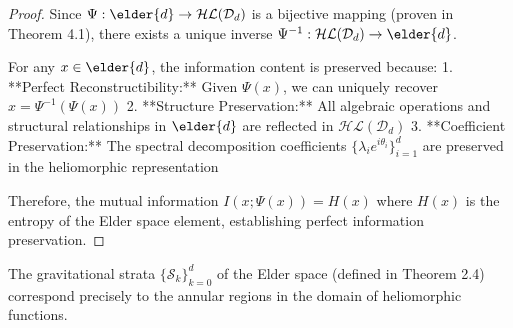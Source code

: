 \begin{proof}
Since $\Psi: \elder{d} \rightarrow \mathcal{HL}(\mathcal{D}_d)$ is a bijective mapping (proven in Theorem 4.1), there exists a unique inverse $\Psi^{-1}: \mathcal{HL}(\mathcal{D}_d) \rightarrow \elder{d}$. 

For any $x \in \elder{d}$, the information content is preserved because:
1. **Perfect Reconstructibility:** Given $\Psi(x)$, we can uniquely recover $x = \Psi^{-1}(\Psi(x))$
2. **Structure Preservation:** All algebraic operations and structural relationships in $\elder{d}$ are reflected in $\mathcal{HL}(\mathcal{D}_d)$
3. **Coefficient Preservation:** The spectral decomposition coefficients $\{\lambda_i e^{i\theta_i}\}_{i=1}^d$ are preserved in the heliomorphic representation

Therefore, the mutual information $I(x; \Psi(x)) = H(x)$ where $H(x)$ is the entropy of the Elder space element, establishing perfect information preservation.
\end{proof}

\begin{theorem}
\label{thm:strata_correspondence}
The gravitational strata $\{\mathcal{S}_k\}_{k=0}^{d}$ of the Elder space (defined in Theorem 2.4) correspond precisely to the annular regions in the domain of heliomorphic functions.
\end{theorem}


